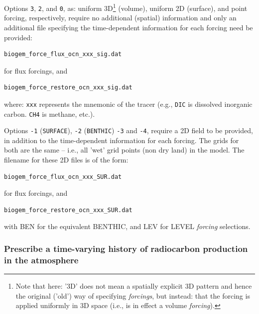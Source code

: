 \documentclass[11pt,fleqn]{book} %
\begin{document}
Options \texttt{3}, \texttt{2}, and \texttt{0}, as: uniform 3D\footnote{Note that here: '3D' does not mean a spatially explicit 3D pattern and hence the original ('old') way of specifying \textit{forcings}, but instead: that the forcing is applied uniformly in 3D space (i.e., is in effect a volume \textit{forcing}).} (volume), uniform 2D (surface), and point forcing, respectively, require no additional (spatial) information and only an additional file specifying the time-dependent information for each forcing need be provided:
\vspace{-2pt}\small\begin{verbatim}
biogem_force_flux_ocn_xxx_sig.dat
\end{verbatim}\normalsize\vspace{-2pt}
for flux forcings, and 
\vspace{-2pt}\small\begin{verbatim}
biogem_force_restore_ocn_xxx_sig.dat
\end{verbatim}\normalsize\vspace{-2pt}
where: \texttt{xxx} represents the mnemonic of the tracer (e.g., \texttt{DIC} is dissolved inorganic carbon. \texttt{CH4} is methane, etc.).

Options \texttt{-1} (\texttt{SURFACE}), \texttt{-2} (\texttt{BENTHIC}) \texttt{-3} and  \texttt{-4}, require a 2D field to be provided, in addition to the time-dependent information for each forcing. The grids for both are the same -- i.e., all 'wet' grid points (non dry land) in the model. The filename for these 2D files is of the form:
\vspace{-2pt}\small\begin{verbatim}
biogem_force_flux_ocn_xxx_SUR.dat
\end{verbatim}\normalsize\vspace{-2pt}
for flux forcings, and 
\vspace{-2pt}\small\begin{verbatim}
biogem_force_restore_ocn_xxx_SUR.dat
\end{verbatim}\normalsize\vspace{-2pt}
with \textsf{\footnotesize BEN} for the equivalent BENTHIC, and \textsf{\footnotesize LEV} for LEVEL \textit{forcing} selections.
 
%
\subsubsection{Prescribe a time-varying history of radiocarbon production in the atmosphere}
\vspace{1mm}
\end{document}
